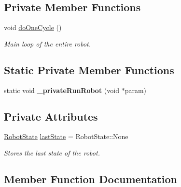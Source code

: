 \subsection*{Private Member Functions}
\begin{DoxyCompactItemize}
\item 
void \mbox{\hyperlink{classlib_iterative_robot_1_1_robot_base_abb65e46433c76fe9d99facd46c1daf95}{do\+One\+Cycle}} ()
\begin{DoxyCompactList}\small\item\em Main loop of the entire robot. \end{DoxyCompactList}\end{DoxyCompactItemize}
\subsection*{Static Private Member Functions}
\begin{DoxyCompactItemize}
\item 
\mbox{\label{classlib_iterative_robot_1_1_robot_base_ada42d96189d265f17075f5140a5b1fd6}} 
static void {\bfseries \+\_\+private\+Run\+Robot} (void $\ast$param)
\end{DoxyCompactItemize}
\subsection*{Private Attributes}
\begin{DoxyCompactItemize}
\item 
\mbox{\label{classlib_iterative_robot_1_1_robot_base_a3c7fd3122a6bd9772e10ca35145530d2}} 
\mbox{\hyperlink{classlib_iterative_robot_1_1_robot_base_a4a63ae91c048bc2f371b175527b3a461}{Robot\+State}} \mbox{\hyperlink{classlib_iterative_robot_1_1_robot_base_a3c7fd3122a6bd9772e10ca35145530d2}{last\+State}} = Robot\+State\+::\+None
\begin{DoxyCompactList}\small\item\em Stores the last state of the robot. \end{DoxyCompactList}\end{DoxyCompactItemize}


\subsection{Member Function Documentation}
\mbox{\label{classlib_iterative_robot_1_1_robot_base_abb65e46433c76fe9d99facd46c1daf95}} 
